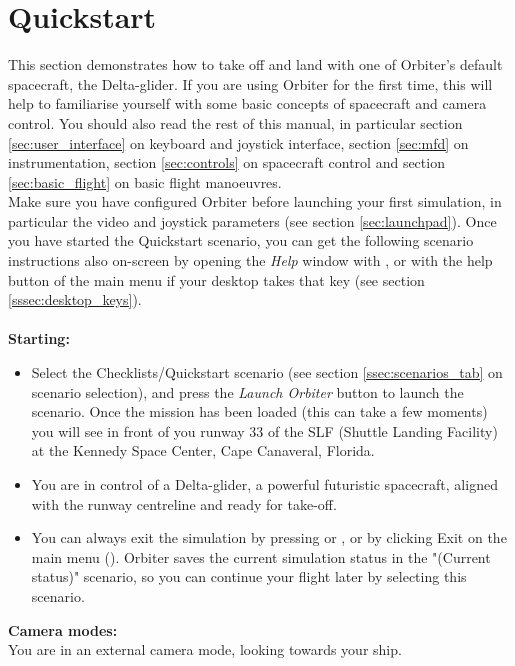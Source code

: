 \documentclass[Orbiter User Manual.tex]{subfiles}
\begin{document}
\section{Quickstart}
\label{sec:quickstart}
This section demonstrates how to take off and land with one of Orbiter's default spacecraft, the Delta-glider. If you are using Orbiter for the first time, this will help to familiarise yourself with some basic concepts of spacecraft and camera control. You should also read the rest of this manual, in particular section \ref{sec:user_interface} on keyboard and joystick interface, section \ref{sec:mfd} on instrumentation, section \ref{sec:controls} on spacecraft control and section \ref{sec:basic_flight} on basic flight manoeuvres.\\
Make sure you have configured Orbiter before launching your first simulation, in particular the video and joystick parameters (see section \ref{sec:launchpad}). Once you have started the Quickstart scenario, you can get the following scenario instructions also on-screen by opening the \textit{Help} window with \Alt{}, or with the help button of the main menu if your desktop takes that key (see section \ref{sssec:desktop_keys}).\\
\\
\textbf{Starting:}

\begin{itemize}
\item Select the Checklists/Quickstart scenario (see section \ref{ssec:scenarios_tab} on scenario selection), and press the \textit{Launch Orbiter} button to launch the scenario. Once the mission has been loaded (this can take a few moments) you will see in front of you runway 33 of the SLF (Shuttle Landing Facility) at the Kennedy Space Center, Cape Canaveral, Florida.
\item You are in control of a Delta-glider, a powerful futuristic spacecraft, aligned with the runway centreline and ready for take-off.
\item You can always exit the simulation by pressing \Ctrl{} or \Alt{}, or by clicking Exit on the main menu (). Orbiter saves the current simulation status in the "(Current status)" scenario, so you can continue your flight later by selecting this scenario.
\end{itemize}

\noindent
\textbf{Camera modes:}\\
You are in an external camera mode, looking towards your ship.
\end{document}
